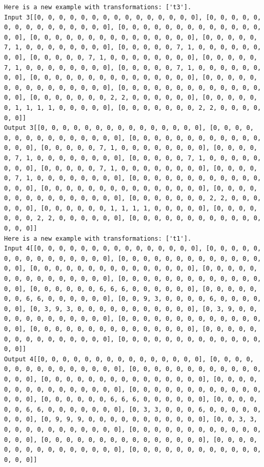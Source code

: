 \begin{lstlisting}
Here is a new example with transformations: ['t3'].
Input 3[[0, 0, 0, 0, 0, 0, 0, 0, 0, 0, 0, 0, 0, 0, 0], [0, 0, 0, 0, 0, 0, 0, 0, 0, 0, 0, 0, 0, 0, 0], [0, 0, 0, 0, 0, 0, 0, 0, 0, 0, 0, 0, 0, 0, 0], [0, 0, 0, 0, 0, 0, 0, 0, 0, 0, 0, 0, 0, 0, 0], [0, 0, 0, 0, 0, 7, 1, 0, 0, 0, 0, 0, 0, 0, 0], [0, 0, 0, 0, 0, 7, 1, 0, 0, 0, 0, 0, 0, 0, 0], [0, 0, 0, 0, 0, 7, 1, 0, 0, 0, 0, 0, 0, 0, 0], [0, 0, 0, 0, 0, 7, 1, 0, 0, 0, 0, 0, 0, 0, 0], [0, 0, 0, 0, 0, 7, 1, 0, 0, 0, 0, 0, 0, 0, 0], [0, 0, 0, 0, 0, 0, 0, 0, 0, 0, 0, 0, 0, 0, 0], [0, 0, 0, 0, 0, 0, 0, 0, 0, 0, 0, 0, 0, 0, 0], [0, 0, 0, 0, 0, 0, 0, 0, 0, 0, 0, 0, 0, 0, 0], [0, 0, 0, 0, 0, 0, 0, 2, 2, 0, 0, 0, 0, 0, 0], [0, 0, 0, 0, 0, 0, 1, 1, 1, 1, 0, 0, 0, 0, 0], [0, 0, 0, 0, 0, 0, 0, 2, 2, 0, 0, 0, 0, 0, 0]]
Output 3[[0, 0, 0, 0, 0, 0, 0, 0, 0, 0, 0, 0, 0, 0, 0], [0, 0, 0, 0, 0, 0, 0, 0, 0, 0, 0, 0, 0, 0, 0], [0, 0, 0, 0, 0, 0, 0, 0, 0, 0, 0, 0, 0, 0, 0], [0, 0, 0, 0, 0, 7, 1, 0, 0, 0, 0, 0, 0, 0, 0], [0, 0, 0, 0, 0, 7, 1, 0, 0, 0, 0, 0, 0, 0, 0], [0, 0, 0, 0, 0, 7, 1, 0, 0, 0, 0, 0, 0, 0, 0], [0, 0, 0, 0, 0, 7, 1, 0, 0, 0, 0, 0, 0, 0, 0], [0, 0, 0, 0, 0, 7, 1, 0, 0, 0, 0, 0, 0, 0, 0], [0, 0, 0, 0, 0, 0, 0, 0, 0, 0, 0, 0, 0, 0, 0], [0, 0, 0, 0, 0, 0, 0, 0, 0, 0, 0, 0, 0, 0, 0], [0, 0, 0, 0, 0, 0, 0, 0, 0, 0, 0, 0, 0, 0, 0], [0, 0, 0, 0, 0, 0, 0, 2, 2, 0, 0, 0, 0, 0, 0], [0, 0, 0, 0, 0, 0, 1, 1, 1, 1, 0, 0, 0, 0, 0], [0, 0, 0, 0, 0, 0, 0, 2, 2, 0, 0, 0, 0, 0, 0], [0, 0, 0, 0, 0, 0, 0, 0, 0, 0, 0, 0, 0, 0, 0]]
Here is a new example with transformations: ['t1'].
Input 4[[0, 0, 0, 0, 0, 0, 0, 0, 0, 0, 0, 0, 0, 0, 0], [0, 0, 0, 0, 0, 0, 0, 0, 0, 0, 0, 0, 0, 0, 0], [0, 0, 0, 0, 0, 0, 0, 0, 0, 0, 0, 0, 0, 0, 0], [0, 0, 0, 0, 0, 0, 0, 0, 0, 0, 0, 0, 0, 0, 0], [0, 0, 0, 0, 0, 0, 0, 0, 0, 0, 0, 0, 0, 0, 0], [0, 0, 0, 0, 0, 0, 0, 0, 0, 0, 0, 0, 0, 0, 0], [0, 0, 0, 0, 0, 0, 6, 6, 6, 0, 0, 0, 0, 0, 0], [0, 0, 0, 0, 0, 0, 0, 6, 6, 0, 0, 0, 0, 0, 0], [0, 0, 9, 3, 0, 0, 0, 0, 6, 0, 0, 0, 0, 0, 0], [0, 3, 9, 3, 0, 0, 0, 0, 0, 0, 0, 0, 0, 0, 0], [0, 3, 9, 0, 0, 0, 0, 0, 0, 0, 0, 0, 0, 0, 0], [0, 0, 0, 0, 0, 0, 0, 0, 0, 0, 0, 0, 0, 0, 0], [0, 0, 0, 0, 0, 0, 0, 0, 0, 0, 0, 0, 0, 0, 0], [0, 0, 0, 0, 0, 0, 0, 0, 0, 0, 0, 0, 0, 0, 0], [0, 0, 0, 0, 0, 0, 0, 0, 0, 0, 0, 0, 0, 0, 0]]
Output 4[[0, 0, 0, 0, 0, 0, 0, 0, 0, 0, 0, 0, 0, 0, 0], [0, 0, 0, 0, 0, 0, 0, 0, 0, 0, 0, 0, 0, 0, 0], [0, 0, 0, 0, 0, 0, 0, 0, 0, 0, 0, 0, 0, 0, 0], [0, 0, 0, 0, 0, 0, 0, 0, 0, 0, 0, 0, 0, 0, 0], [0, 0, 0, 0, 0, 0, 0, 0, 0, 0, 0, 0, 0, 0, 0], [0, 0, 0, 0, 0, 0, 0, 0, 0, 0, 0, 0, 0, 0, 0], [0, 0, 0, 0, 0, 0, 6, 6, 6, 0, 0, 0, 0, 0, 0], [0, 0, 0, 0, 0, 0, 6, 6, 0, 0, 0, 0, 0, 0, 0], [0, 3, 3, 0, 0, 0, 6, 0, 0, 0, 0, 0, 0, 0, 0], [0, 9, 9, 9, 0, 0, 0, 0, 0, 0, 0, 0, 0, 0, 0], [0, 0, 3, 3, 0, 0, 0, 0, 0, 0, 0, 0, 0, 0, 0], [0, 0, 0, 0, 0, 0, 0, 0, 0, 0, 0, 0, 0, 0, 0], [0, 0, 0, 0, 0, 0, 0, 0, 0, 0, 0, 0, 0, 0, 0], [0, 0, 0, 0, 0, 0, 0, 0, 0, 0, 0, 0, 0, 0, 0], [0, 0, 0, 0, 0, 0, 0, 0, 0, 0, 0, 0, 0, 0, 0]]

\end{lstlisting}
